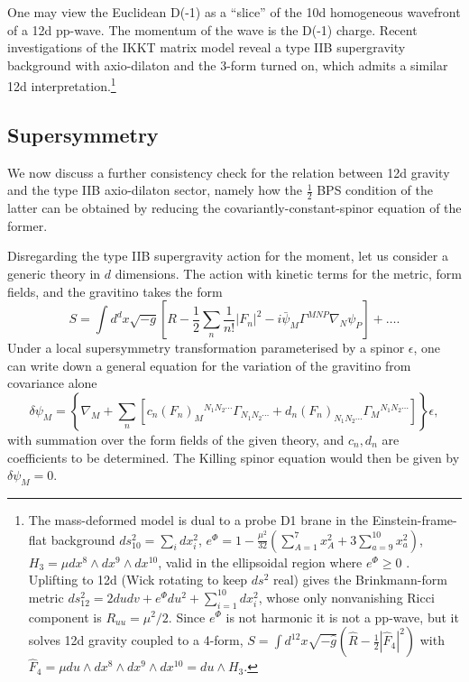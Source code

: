 One may view the Euclidean D(-1) as a ``slice'' of the 10d homogeneous wavefront of a 12d pp-wave.
The momentum of the wave is the D(-1) charge.
Recent investigations of the IKKT matrix model \cite{Hartnoll:2024csr,Komatsu:2024bop} reveal a type IIB supergravity background with axio-dilaton and the 3-form turned on, which admits a similar 12d interpretation.\footnote{
The mass-deformed model is dual to a probe D1 brane in the Einstein-frame-flat background $ds_{10}^2 = \sum_i dx_i^2$, $e^\Phi = 1 - \frac{\mu^2}{32}\left(\sum_{A=1}^7 x_A^2 + 3\sum_{a=9}^{10}x_a^2\right)$, $H_3 = \mu dx^8\wedge dx^9\wedge dx^{10}$, valid in the ellipsoidal region where $e^\Phi\ge0$ \cite{Hartnoll:2024csr}. Uplifting to 12d (Wick rotating to keep $ds^2$ real) gives the Brinkmann-form metric $ds_{12}^2 = 2dudv + e^\Phi du^2 + \sum_{i=1}^{10}dx_i^2$, whose only nonvanishing Ricci component is $R_{uu}=\mu^2/2$. Since $e^\Phi$ is not harmonic it is not a pp-wave, but it solves 12d gravity coupled to a 4-form, $S = \int d^{12}x\sqrt{-\widehat{g}}\left(\widehat{R}-\tfrac12|\widehat{F}_4|^2\right)$ with $\widehat{F}_4 = \mu du\wedge dx^8\wedge dx^9\wedge dx^{10} = du\wedge H_3$.
}

\subsection{Supersymmetry}
We now discuss a further consistency check for the relation between 12d gravity and the type IIB axio-dilaton sector, namely how the $\tfrac{1}{2}$ BPS condition of the latter can be obtained by reducing the covariantly-constant-spinor equation of the former.

Disregarding the type IIB supergravity action for the moment, let us consider a generic theory in $d$ dimensions.
The action with kinetic terms for the metric, form fields, and the gravitino takes the form
\begin{equation}
S = \int d^d x  \sqrt{-g}\left[
R
- \frac{1}{2}\sum_n \frac{1}{n!} |F_n|^2
- i \bar{\psi}_M \Gamma^{MNP} \nabla_N \psi_P
\right] + \dots.
\label{generic sugra action}
\end{equation}
Under a local supersymmetry transformation parameterised by a spinor $\epsilon$, one can write down a general equation for the variation of the gravitino from covariance alone
\begin{equation}
\delta\psi_M
= \left\{
\nabla_M + \sum_n \left[
c_n (F_{n})_M{}^{N_1 N_2 \cdots} \Gamma_{N_1 N_2 \cdots}
+ d_n (F_{n})_{N_1 N_2 \cdots} \Gamma_M{}^{N_1 N_2 \cdots}
\right]
\right\}\epsilon,
\label{generic gravitino variation}
\end{equation}
with summation over the form fields of the given theory, and $c_n, d_n$ are coefficients to be determined.
The Killing spinor equation would then be given by $\delta\psi_M=0$.

